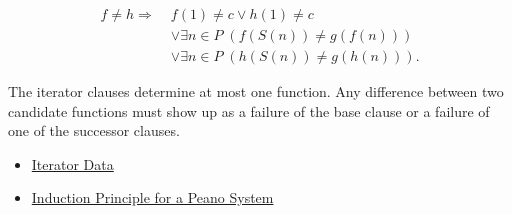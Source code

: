 \begin{remark*}
\[
\begin{aligned}
f\neq h
\Longrightarrow\;&
f(1)\neq c\lor h(1)\neq c\\
&\lor \exists n\in P\;(f(S(n))\neq g(f(n)))\\
&\lor \exists n\in P\;(h(S(n))\neq g(h(n))).
\end{aligned}
\]
\end{remark*}

\begin{remark*}[Interpretation]
The iterator clauses determine at most one function. Any difference between
two candidate functions must show up as a failure of the base clause or a
failure of one of the successor clauses.
\end{remark*}

\begin{dependencies}
\begin{itemize}
  \item \hyperref[def:iterator-data-on-peano-system]{Iterator Data}
  \item \hyperref[thm:induction-principle-for-peano-system]{Induction Principle for a Peano System}
\end{itemize}
\end{dependencies}


